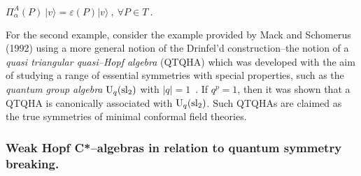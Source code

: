 \documentclass[12pt]{article}
\theoremstyle{plain}
\theoremstyle{definition}
\numberwithin{equation}{section}
\newcommand{\U}{{\rm U}}
\newcommand{\vep}{\varepsilon}
\renewcommand{\a}{\alpha}
\newcommand{\<}{{\langle}}
\begin{document}
$\Pi^A_{\a} (P)~\vert v \rangle = \vep(P) \vert v \rangle~,~
\forall P \in T~.$

For the second example, consider the example provided by Mack and Schomerus (1992)
using a more general notion of the Drinfel'd construction--the notion of a \emph{quasi
triangular quasi--Hopf algebra} (QTQHA) which was developed with the aim
of studying a range of essential symmetries with special properties, such as the 
\emph{quantum group algebra} $\U_q (\rm{sl}_2)$ with $\vert q \vert =1$~. If $q^p=1$, 
then it was shown that a QTQHA is canonically associated with $\U_q (\rm{sl}_2)$. Such QTQHAs are
claimed as the true symmetries of minimal conformal field theories.


\subsubsection{Weak Hopf C*--algebras in relation to quantum symmetry breaking.}
\end{document}
